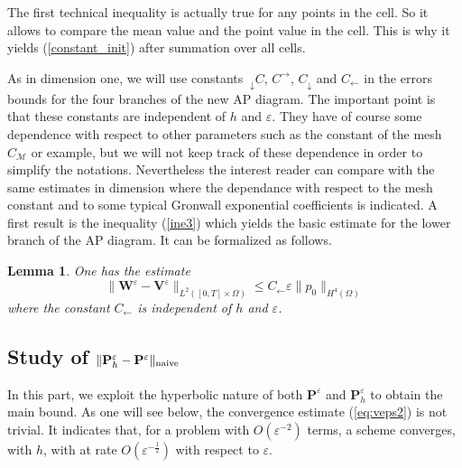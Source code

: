 \documentclass[a4paper,french,english,10pt]{article}
\newcommand\eps{\varepsilon}
\newcommand\W{\mathbf{W}}
\newtheorem{lemma}[theorem]{Lemma}
\begin{document}
The first technical inequality is actually true  for any points in the cell.
So it allows to compare the mean value and the point value in the cell. This is why it yields
(\ref{constant_init}) after summation over all cells.



As in dimension one, we will use constants $~_\downarrow C$, $C^\rightarrow$, $C_\downarrow$ and
$C_\leftarrow$ in the errors bounds for the four branches of the new AP diagram.
The important point is that these constants are independent of $h$ and $\eps$.
They have of course some dependence with respect to other parameters such as 
the constant of the mesh $C_\mathcal M$ or example,
but we will not keep track of these dependence in order to simplify the notations.
Nevertheless the interest reader can compare with the same estimates in dimension where
the dependance with respect to the mesh constant and to some typical Gronwall exponential coefficients
is indicated.
A first result is the  inequality   (\ref{ine3}) which  yields the basic estimate for the lower branch of the AP diagram.
It can be formalized as follows.

\begin{lemma}
One has the estimate
\begin{equation} \label{eq:enc22}
\|\W^\eps-\mathbf V^\eps\|
_{ L^2([0,T]\times\Omega   ) } %
\leq C_\leftarrow  \eps \|  p_0 \|_  { H^4(\Omega)  } 
\end{equation}
where the constant $C_\leftarrow $ is independent of $h$ and $\eps$.
\end{lemma}







\subsection{Study of $\| \mathbf 
P_h^\varepsilon -\mathbf P^\varepsilon \|_{\rm naive}$}


In this part, we exploit the hyperbolic nature
of both 
$\mathbf P^\varepsilon$ and $\mathbf P_h^\varepsilon $ to obtain the main bound.
As one will see below, the convergence estimate
(\ref{eq:veps2}) is not trivial. It indicates that, 
for a problem with $O(\varepsilon^{-2})$ terms, a scheme 
converges, with $h$, with  at rate $O(\varepsilon^{-\frac12})$ with respect to
$\eps$.
\end{document}
